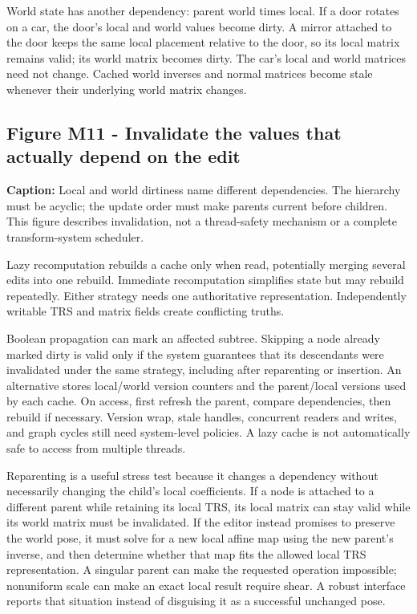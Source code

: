 World state has another dependency: parent world times local. If a door rotates on a car, the door's local and world values become dirty. A mirror attached to the door keeps the same local placement relative to the door, so its local matrix remains valid; its world matrix becomes dirty. The car's local and world matrices need not change. Cached world inverses and normal matrices become stale whenever their underlying world matrix changes.

\subsection{Figure M11 - Invalidate the values that actually depend on the edit}\label{01-foundations-i-ch019-figure-m11---invalidate-the-values-that-actually-depend-on-the-edit}

\hypertarget{01-foundations-i-ch019-figure-m11---invalidate-the-values-that-actually-depend-on-the-edit}{}


\textbf{Caption:} Local and world dirtiness name different dependencies. The hierarchy must be acyclic; the update order must make parents current before children. This figure describes invalidation, not a thread-safety mechanism or a complete transform-system scheduler.

Lazy recomputation rebuilds a cache only when read, potentially merging several edits into one rebuild. Immediate recomputation simplifies state but may rebuild repeatedly. Either strategy needs one authoritative representation. Independently writable TRS and matrix fields create conflicting truths.

Boolean propagation can mark an affected subtree. Skipping a node already marked dirty is valid only if the system guarantees that its descendants were invalidated under the same strategy, including after reparenting or insertion. An alternative stores local/world version counters and the parent/local versions used by each cache. On access, first refresh the parent, compare dependencies, then rebuild if necessary. Version wrap, stale handles, concurrent readers and writes, and graph cycles still need system-level policies. A  lazy cache is not automatically safe to access from multiple threads.

Reparenting is a useful stress test because it changes a dependency without necessarily changing the child's local coefficients. If a node is attached to a different parent while retaining its local TRS, its local matrix can stay valid while its world matrix must be invalidated. If the editor instead promises to preserve the world pose, it must solve for a new local affine map using the new parent's inverse, and then determine whether that map fits the allowed local TRS representation. A singular parent can make the requested operation impossible; nonuniform scale can make an exact local result require shear. A robust interface reports that situation instead of disguising it as a successful unchanged pose.

